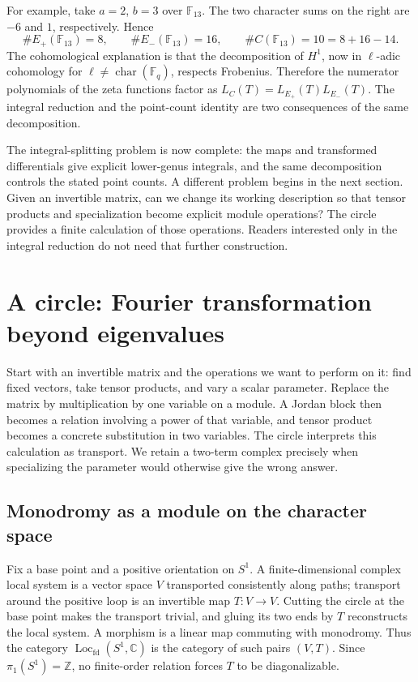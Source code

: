 \documentclass[11pt]{article}
\theoremstyle{remark}
\newcommand{\C}{\mathbb C}
\begin{document}
For example, take \(a=2\), \(b=3\) over \(\mathbb F_{13}\). The two character sums on the right are \(-6\) and \(1\), respectively. Hence
\[
\#E_+(\mathbb F_{13})=8,\qquad
\#E_-(\mathbb F_{13})=16,\qquad
\#C(\mathbb F_{13})=10=8+16-14.
\]
The cohomological explanation is that the decomposition of \(H^1\), now in \(\ell\)-adic cohomology for \(\ell\ne\operatorname{char}(\mathbb F_q)\), respects Frobenius. Therefore the numerator polynomials of the zeta functions factor as \(L_C(T)=L_{E_+}(T)L_{E_-}(T)\). The integral reduction and the point-count identity are two consequences of the same decomposition.

The integral-splitting problem is now complete: the maps and transformed differentials give explicit lower-genus integrals, and the same decomposition controls the stated point counts. A different problem begins in the next section. Given an invertible matrix, can we change its working description so that tensor products and specialization become explicit module operations? The circle provides a finite calculation of those operations. Readers interested only in the integral reduction do not need that further construction.

\section{A circle: Fourier transformation beyond eigenvalues}
\label{circle:section}

Start with an invertible matrix and the operations we want to perform on it: find fixed vectors, take tensor products, and vary a scalar parameter. Replace the matrix by multiplication by one variable on a module. A Jordan block then becomes a relation involving a power of that variable, and tensor product becomes a concrete substitution in two variables. The circle interprets this calculation as transport. We retain a two-term complex precisely when specializing the parameter would otherwise give the wrong answer.

\subsection{Monodromy as a module on the character space}

Fix a base point and a positive orientation on \(S^1\). A finite-dimensional complex local system is a vector space \(V\) transported consistently along paths; transport around the positive loop is an invertible map \(T:V\to V\). Cutting the circle at the base point makes the transport trivial, and gluing its two ends by \(T\) reconstructs the local system. A morphism is a linear map commuting with monodromy. Thus the category \(\operatorname{Loc}_{\mathrm{fd}}(S^1,\C)\) is the category of such pairs \((V,T)\). Since \(\pi_1(S^1)=\mathbb Z\), no finite-order relation forces \(T\) to be diagonalizable.
\end{document}
